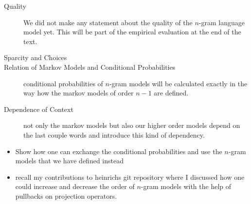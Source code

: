 \documentclass[•]{book}
\begin{document}
\begin{remark}
\begin{description}
\item[Quality] We did not make any statement about the quality of the $n$-gram language model yet. This will be part of the empirical evaluation at the end of the text. 
\item[Sparcity and Choices] 
\item[Relation of Markov Models and Conditional Probabilities] conditional probabilities of $n$-gram models will be calculated exactly in the way how the markov models of order $n-1$ are defined. 
\item[Dependence of Context] not only the markov models but also our higher order models depend on the last couple words and introduce this kind of dependency. 
\end{description}
\end{remark}


\begin{itemize}
\item Show how one can exchange the conditional probabilities and use the $n$-gram models that we have defined instead
\item recall my contributions to heinrichs git repository where I discussed how one could increase and decrease the order of $n$-gram models with the help of pullbacks on projection operators. 
\end{itemize}
\end{document}
